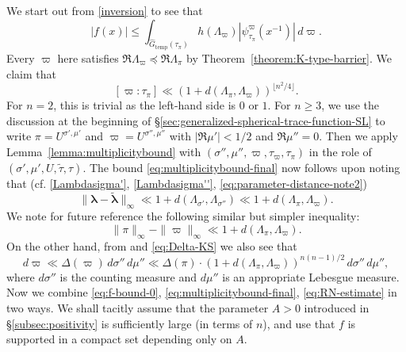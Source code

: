 \documentclass[11pt,oneside]{amsart}
\numberwithin{equation}{section}
\theoremstyle{remark}
\theoremstyle{plain}
\renewcommand\leq{\leqslant}
\renewcommand\geq{\geqslant}
\newcommand\Gtemp{\widehat{G}_\mathrm{temp}}
\begin{document}
We start out from \eqref{inversion} to see that
\begin{equation}\label{eq:f-bound-0}
|f(x)| \leq \int_{\Gtemp(\tau_{\pi})} h(\Lambda_{\varpi}) |\psi_{\tau_{\pi}}^{\varpi}(x^{-1})| \,d\varpi.
\end{equation}
Every $\varpi$ here satisfies $\Re\Lambda_{\varpi}\preceq \Re\Lambda_{\pi}$ by Theorem~\ref{theorem:K-type-barrier}. We claim that
\begin{equation}\label{eq:multiplicitybound-final}
[\varpi:\tau_{\pi}] \ll (1+d(\Lambda_{\pi},\Lambda_{\varpi}))^{\lfloor n^2/4\rfloor}.
\end{equation}
For $n=2$, this is trivial as the left-hand side is $0$ or $1$. For $n\geq 3$, we use the discussion at the beginning of \S\ref{sec:generalized-spherical-trace-function-SL} to write $\pi=U^{\sigma',\mu'}$ and $\varpi=U^{\sigma'',\mu''}$ with $|\Re\mu'|<1/2$ and $\Re \mu'' = 0$. Then we apply Lemma~\ref{lemma:multiplicitybound} with $(\sigma'',\mu'',\varpi, \tau_{\varpi},\tau_{\pi})$ in the role of $(\sigma',\mu',U,\tilde{\tau},\tau)$. The bound \eqref{eq:multiplicitybound-final} now follows upon noting that (cf. \eqref{Lambdasigma'}, \eqref{Lambdasigma''}, \eqref{eq:parameter-distance-note2})
\begin{equation}\label{eq:lambda-diff-bound}
\|\bm\lambda - \tilde{\bm\lambda}\|_{\infty} \ll 1+d(\Lambda_{\sigma'},\Lambda_{\sigma''}) \ll 1+d(\Lambda_{\pi},\Lambda_{\varpi}).
\end{equation}
We note for future reference the following similar but simpler inequality:
\begin{equation}\label{eq:normdifference}
\|\pi\|_\infty-\|\varpi\|_\infty\ll 1+d(\Lambda_{\pi},\Lambda_{\varpi}).
\end{equation}
On the other hand, from \cite[(6.3)]{KS} and \eqref{eq:Delta-KS} we also see that
\begin{equation}\label{eq:RN-estimate}
d\varpi \ll \Delta(\varpi)\,d\sigma''\,d\mu''
\ll \Delta(\pi)\cdot(1+d(\Lambda_{\pi},\Lambda_{\varpi}))^{n(n-1)/2}\,d\sigma''\,d\mu'',
\end{equation}
where $d\sigma''$ is the counting measure and $d\mu''$ is an appropriate Lebesgue measure. Now we combine \eqref{eq:f-bound-0}, \eqref{eq:multiplicitybound-final}, \eqref{eq:RN-estimate} in two ways. We shall tacitly assume that the parameter $A>0$ introduced in \S\ref{subsec:positivity} is sufficiently large (in terms of $n$), and use that  $f$ is supported in a compact set depending only on $A$.
\end{document}
